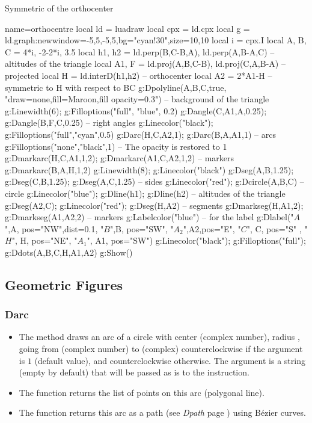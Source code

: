 \begin{demo}{Symmetric of the orthocenter}
\begin{luadraw}{name=orthocentre}
local ld = luadraw
local cpx = ld.cpx
local g = ld.graph:new{window={-5,5,-5,5},bg="cyan!30",size={10,10}}
local i = cpx.I
local A, B, C = 4*i, -2-2*i, 3.5
local h1, h2 = ld.perp({B,C-B},A), ld.perp({A,B-A},C) -- altitudes of the triangle
local A1, F = ld.proj(A,{B,C-B}), ld.proj(C,{A,B-A}) -- projected
local H = ld.interD(h1,h2) -- orthocenter
local A2 = 2*A1-H -- symmetric to H with respect to BC
g:Dpolyline({A,B,C},true, "draw=none,fill=Maroon,fill opacity=0.3") -- background of the triangle
g:Linewidth(6); g:Filloptions("full", "blue", 0.2)
g:Dangle(C,A1,A,0.25); g:Dangle(B,F,C,0.25) -- right angles
g:Linecolor("black"); g:Filloptions("full","cyan",0.5)
g:Darc(H,C,A2,1); g:Darc(B,A,A1,1) -- arcs
g:Filloptions("none","black",1) -- The opacity is restored to 1
g:Dmarkarc(H,C,A1,1,2); g:Dmarkarc(A1,C,A2,1,2) -- markers
g:Dmarkarc(B,A,H,1,2)
g:Linewidth(8); g:Linecolor("black")
g:Dseg({A,B},1.25); g:Dseg({C,B},1.25); g:Dseg({A,C},1.25) -- sides
g:Linecolor("red"); g:Dcircle(A,B,C) -- circle
g:Linecolor("blue"); g:Dline(h1); g:Dline(h2) -- altitudes of the triangle
g:Dseg({A2,C}); g:Linecolor("red"); g:Dseg({H,A2}) -- segments
g:Dmarkseg(H,A1,2); g:Dmarkseg(A1,A2,2) -- markers
g:Labelcolor("blue") -- for the label
g:Dlabel("$A$",A, {pos="NW",dist=0.1}, "$B$",B, {pos="SW"}, "$A_2$",A2,{pos="E"},
"$C$", C, {pos="S" }, "$H$", H, {pos="NE"}, "$A_1$", A1, {pos="SW"})
g:Linecolor("black"); g:Filloptions("full"); g:Ddots({A,B,C,H,A1,A2})
g:Show()
\end{luadraw}
\end{demo}

\subsection{Geometric Figures}

\subsubsection{Darc}
\begin{itemize}
    \item The  method draws an arc of a circle with center  (complex number), radius , going from  (complex number) to  (complex) counterclockwise if the argument  is $1$ (default value), and counterclockwise otherwise. The argument  is a string (empty by default) that will be passed as is to the \drawcmd instruction.
    \item The  function returns the list of points on this arc (polygonal line).
    \item The function  returns this arc as a path (see \emph{Dpath} page \pageref{Dpath}) using Bézier curves.
\end{itemize}

